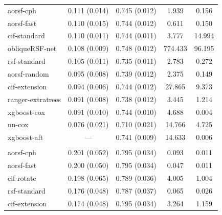 \documentclass[12pt]{article}\usepackage[]{graphicx}\usepackage[]{xcolor}
\newenvironment{knitrout}{}{} %
\begin{document}
\begin{knitrout}
\begin{longtable}[t]{lcccc}
\hspace{1em}aorsf-cph & 0.111 (0.014) & 0.745 (0.012) & 1.939 & 0.156\\
\hspace{1em}aorsf-fast & 0.110 (0.015) & 0.744 (0.012) & 0.611 & 0.150\\
\hspace{1em}cif-standard & 0.110 (0.011) & 0.744 (0.011) & 3.777 & 14.994\\
\hspace{1em}obliqueRSF-net & 0.108 (0.009) & 0.748 (0.012) & 774.433 & 96.195\\
\hspace{1em}rsf-standard & 0.105 (0.011) & 0.735 (0.011) & 2.783 & 0.272\\
\hspace{1em}aorsf-random & 0.095 (0.008) & 0.739 (0.012) & 2.375 & 0.149\\
\hspace{1em}cif-extension & 0.094 (0.006) & 0.744 (0.012) & 27.865 & 9.373\\
\hspace{1em}ranger-extratrees & 0.091 (0.008) & 0.738 (0.012) & 3.445 & 1.214\\
\hspace{1em}xgboost-cox & 0.091 (0.010) & 0.744 (0.010) & 4.688 & 0.004\\
\hspace{1em}nn-cox & 0.076 (0.021) & 0.710 (0.021) & 14.766 & 4.725\\
\hspace{1em}xgboost-aft & --- & 0.741 (0.009) & 14.633 & 0.006\\
\addlinespace[0.3em]
\multicolumn{5}{l}{\textit{\textbf{VA lung cancer trial; death, n = 137, p = 8}}}\\
\hline
\hspace{1em}aorsf-cph & 0.201 (0.052) & 0.795 (0.034) & 0.093 & 0.011\\
\hspace{1em}aorsf-fast & 0.200 (0.050) & 0.795 (0.034) & 0.047 & 0.011\\
\hspace{1em}cif-rotate & 0.198 (0.065) & 0.789 (0.036) & 4.005 & 1.004\\
\hspace{1em}rsf-standard & 0.176 (0.048) & 0.787 (0.037) & 0.065 & 0.026\\
\hspace{1em}cif-extension & 0.174 (0.048) & 0.795 (0.034) & 3.264 & 1.159\\

\end{longtable}
\end{knitrout}
\end{document}
